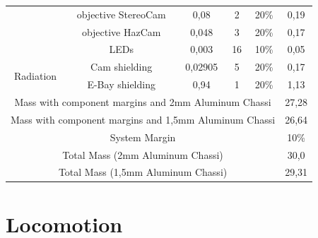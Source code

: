 \begin{table}[]
{\begin{tabular}{cccccc}
                                         & objective StereoCam                 & 0,08                        & 2        & 20\%             & 0,19           \\
                                         & objective HazCam                    & 0,048                       & 3        & 20\%             & 0,17           \\
                                         & LEDs                                & 0,003                       & 16       & 10\%             & 0,05           \\
\multirow{2}{*}{Radiation}               & Cam shielding                       & 0,02905                     & 5        & 20\%             & 0,17           \\
                                         & E-Bay shielding                     & 0,94                        & 1        & 20\%             & 1,13           \\
\multicolumn{5}{c}{Mass with component margins and 2mm Aluminum Chassi}                                                                    & 27,28          \\
\multicolumn{5}{c}{Mass with component margins and 1,5mm Aluminum Chassi}                                                                  & 26,64          \\
\multicolumn{5}{c}{System Margin}                                                                                                          & 10\%           \\
\multicolumn{5}{c}{Total Mass (2mm Aluminum Chassi)}                                                                                       & 30,0           \\
\multicolumn{5}{c}{Total Mass (1,5mm Aluminum Chassi)}                                                                                     & 29,31          \\\hline
\end{tabular}%
}
\end{table}

\clearpage

\setcounter{figure}{0}
\setcounter{table}{0}

\section{Locomotion} 
\label{app:Loco}

